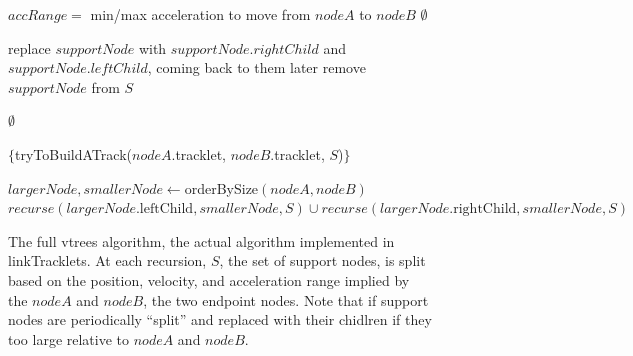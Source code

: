 \begin{figure}[ht!]
\begin{algorithmic}


\STATE $accRange = $ min/max acceleration to move from $nodeA$ to $nodeB$
    \RETURN $\emptyset$
  \ELSE
  
    \STATE replace $supportNode$ with $supportNode.rightChild$ and $supportNode.leftChild$, coming back to them later
    \ELSE
      \STATE remove $supportNode$ from $S$
    \ENDIF
  \ENDIF

    \RETURN $\emptyset$ 
  \ENDIF

  \ENDFOR

    \STATE {}

       \RETURN $\{$tryToBuildATrack($nodeA$.tracklet, $nodeB$.tracklet, $S$)$\}$
    \ELSE

       \STATE $largerNode, smallerNode \gets $orderBySize$(nodeA, nodeB)$
       \RETURN $recurse(largerNode.\text{leftChild}, smallerNode, S) \cup recurse(largerNode.\text{rightChild}, smallerNode, S)$
  \ENDIF
\ENDIF

\end{algorithmic}
\caption{The full vtrees algorithm, the actual algorithm implemented
  in linkTracklets.  At each recursion, $S$, the set of support nodes,
  is split based on the position, velocity, and acceleration range
  implied by the $nodeA$ and $nodeB$, the two endpoint nodes.  Note
  that if support nodes are periodically ``split'' and replaced with
  their chidlren if they too large relative to $nodeA$ and $nodeB$.}
 \label{linkTrackletsAlgorithm}
\end{figure}

